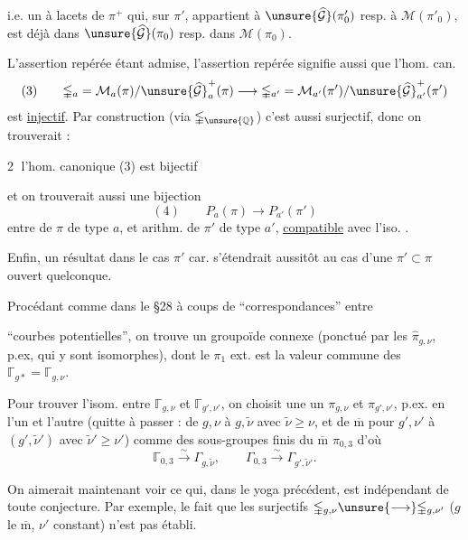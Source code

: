 i.e. un  à lacets de $\pi^{+}$ qui, sur $\pi'$, appartient à $\unsure{\widehat{\mathcal G}}(\pi'_0)$  resp. à $\mathcal M(\pi'_0)$, est déjà dans $\unsure{\widehat{\mathcal G}}(\pi_0)$ resp. dans $\mathcal M(\pi_0)$.

L'assertion  repérée étant admise, l'assertion  repérée signifie aussi que l'hom. can.
\[
(3)\qquad
\mathbb{\Gamma}_a=\mathcal M_a(\pi)/\unsure{\widehat{\mathcal G}}^{+}_a(\pi)
\longrightarrow
\mathbb{\Gamma}_{a'}=\mathcal M_{a'}(\pi')/\unsure{\widehat{\mathcal G}}^{+}_{a'}(\pi')
\]
est \uline{injectif}. Par construction (via $\mathbb{\Gamma}_{\unsure{\mathbb Q}}$) c'est aussi surjectif, donc on trouverait :

\textcircled{2} l'hom. canonique (3) est bijectif

et on trouverait aussi une bijection
\[
(4)\qquad P_a(\pi)\longrightarrow P_{a'}(\pi')
\]
entre  de $\pi$ de type $a$, et arithm. de $\pi'$ de type $a'$, \uline{compatible} avec l'iso. .

Enfin, un résultat dans le cas $\pi'$  car. s'étendrait aussitôt au cas d'une $\pi'\subset\pi$ ouvert quelconque.

Procédant  comme dans le \S 28 à coups de ``correspondances''  entre

``courbes potentielles'', on trouve un groupoïde connexe (ponctué par les $\widehat{\pi}_{g,\nu}$, p.ex, \deleted{\unsure{)}} qui y sont  isomorphes), dont le $\pi_1$ ext. est la valeur commune des $\mathbb{\Gamma}_{g*}=\mathbb{\Gamma}_{g,\nu}$.

Pour trouver  l'isom.  entre $\mathbb{\Gamma}_{g,\nu}$ et $\mathbb{\Gamma}_{g',\nu'}$, on choisit une   un $\pi_{g,\nu}$ et $\pi_{g',\nu'}$, p.ex. en   l'un et l'autre (quitte à passer : de $g,\nu$ à $g,\widetilde{\nu}$ avec $\widetilde{\nu}\geq\nu$, et de $\overline{\mathrm m}$ pour $g',\nu'$ à $(g',\widetilde{\nu}')$ avec $\widetilde{\nu}'\geq\nu'$) comme des sous-groupes finis du $\overline{\mathrm m}$ $\pi_{0,3}$  d'où
\[
\mathbb{\Gamma}_{0,3}\xrightarrow{\sim}\Gamma_{g,\widetilde{\nu}},
\qquad
\Gamma_{0,3}\xrightarrow{\sim}\Gamma_{g',\widetilde{\nu}'}.
\]

On aimerait maintenant voir ce qui, dans le yoga précédent, est indépendant de toute conjecture. Par exemple, le fait que les  surjectifs  $\mathbb{\Gamma}_{g,\nu}\unsure{\longrightarrow}\mathbb{\Gamma}_{g,\nu'}$ ($g$ le $\overline{\mathrm m}$, $\nu'$ constant) n'est pas établi.

